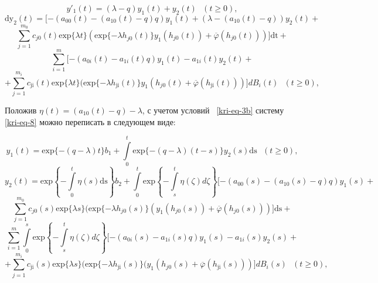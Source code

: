 \begin{equation*}
	y'_{1}(t)=(\lambda -q)y_1(t)+y_2(t)\text{   }(t\ge 0),
\end{equation*}
\begin{equation*}	
	\text{dy}_2(t)=[-(a_{00}(t)-(a_{10}(t)-q)q)y_1(t)+(\lambda -(a_{10}(t)-q))y_2(t)+
\end{equation*}
\begin{equation}\label{kri-eq-8}	
	\overset{m_0}{\underset{j=1}{\sum }}c_{\mathit{j0}}(t)\text{exp}\{\mathit{\lambda t}\}(\text{exp}\{-\mathit{\lambda
		h}_{\mathit{j0}}(t)\}y_1(h_{\mathit{j0}}(t))+\overline{\varphi
	}(h_{\mathit{j0}}(t)))]\text{dt}+
\end{equation}
\begin{equation*}
	\overset m{\underset{i=1}{\sum
	}}[-(a_{0i}(t)-a_{1i}(t)q)y_1(t)-a_{1i}(t)y_2(t)+
\end{equation*}
\begin{equation*}
	+\overset{m_i}{\underset{j=1}{\sum
	}}c_{\text{ji}}(t)\text{exp}\{\mathit{\lambda t}\}(\text{exp}\{-\mathit{\lambda
		h}_{\text{ji}}(t)\}y_1(h_{\mathit{j0}}(t)+\overline{\varphi
	}(h_{\text{ji}}(t)))]\mathit{dB}_i(t)\text{  }(t\ge 0),
\end{equation*}

Положив  $\eta (t)=(a_{10}(t)-q)-\lambda $, с учетом условий \ \eqref{kri-eq-3b} систему \eqref{kri-eq-8} можно переписать в следующем виде:

\begin{equation*}
	y_1(t)=\text{exp}\{-(q-\lambda )t\}b_1+\overset t{\underset 0{\int }}\text{exp}\{-(q-\lambda
	)(t-s)\}y_2(s)\text{ds}\text{   }(t\ge 0),
\end{equation*}
\begin{equation*}		
	y_2(t)=\text{exp}\left\{-\overset t{\underset 0{\int }}\eta (s)\text{ds}\right\}b_2+\overset
	t{\underset 0{\int }}\text{exp}\left\{-\overset t{\underset s{\int }}\eta (\zeta )\mathit{d\zeta
	}\right\}[-(a_{00}(s)-(a_{10}(s)-q)q)y_1(s)+
\end{equation*}	
\begin{equation}\label{kri-eq-9}
	\overset{m_0}{\underset{j=1}{\sum
	}}c_{\mathit{j0}}(s)\text{exp}\{\mathit{\lambda s}\}(\text{exp}\{-\mathit{\lambda
		h}_{\mathit{j0}}(s)\}(y_1(h_{\mathit{j0}}(s))+\overline{\varphi
	}(h_{\mathit{j0}}(s)))]\text{ds}+
\end{equation}	
\begin{equation*}
	\overset m{\underset{i=1}{\sum }}\overset s{\underset
		0{\int }}\text{exp}\left\{-\overset t{\underset s{\int }}\eta (\zeta )\mathit{d\zeta
	}\right\}[-(a_{0i}(s)-a_{1i}(s)q)y_1(s)-a_{1i}(s)y_2(s)+
\end{equation*}	
\begin{equation*}
	+\overset{m_i}{\underset{j=1}{\sum
	}}c_{\text{ji}}(s)\text{exp}\{\mathit{\lambda s}\}(\text{exp}\{-\mathit{\lambda
		h}_{\text{ji}}(s)\}(y_1(h_{\mathit{j0}}(s)+\overline{\varphi
	}(h_{\text{ji}}(s)))]\mathit{dB}_i(s)\text{  }(t\ge 0),
\end{equation*}

